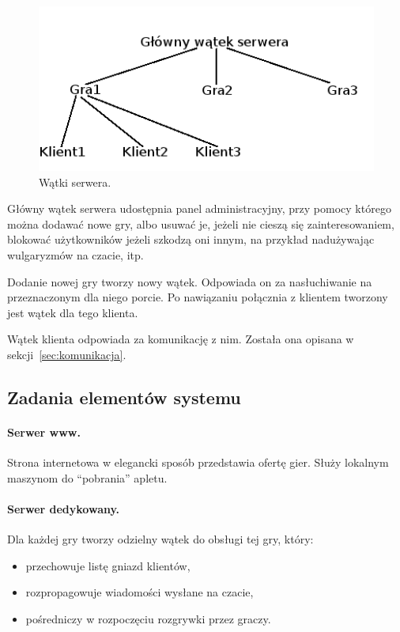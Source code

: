 \documentclass[a4paper, 12pt]{article}
\begin{document}
\begin{figure}
\centering
\includegraphics{rysunki/watki.png}
\caption{Wątki serwera.}
\label{fig:watki}
\end{figure}

Główny wątek serwera udostępnia panel administracyjny, przy pomocy którego można dodawać nowe gry, albo usuwać je, jeżeli nie cieszą się zainteresowaniem, blokować użytkowników jeżeli szkodzą oni innym, na przykład nadużywając wulgaryzmów na czacie, itp.

Dodanie nowej gry tworzy nowy wątek. Odpowiada on za nasłuchiwanie na przeznaczonym dla niego porcie. Po nawiązaniu połącznia z klientem tworzony jest wątek dla tego klienta.

Wątek klienta odpowiada za komunikację z nim. Została ona opisana w sekcji~\ref{sec:komunikacja}.

\subsection{Zadania elementów systemu}
\paragraph{Serwer www.}
Strona internetowa w elegancki sposób przedstawia ofertę gier. Służy lokalnym maszynom do ``pobrania'' apletu.

\paragraph{Serwer dedykowany.}
Dla każdej gry tworzy odzielny wątek do obsługi tej gry, który:
\begin{itemize}
 \item przechowuje listę gniazd klientów,
 \item rozpropagowuje wiadomości wysłane na czacie,
 \item pośredniczy w rozpoczęciu rozgrywki przez graczy.
\end{itemize}
\end{document}
